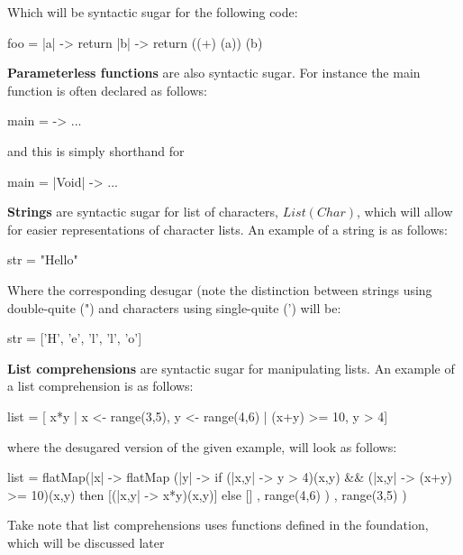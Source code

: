 Which will be syntactic sugar for the following code:
\begin{kite}

  foo = |a| -> {
    return |b| -> {
      return ((+) (a)) (b)
    }
  }
\end{kite}

\textbf{Parameterless functions} are also syntactic sugar. For instance the main function is often declared as follows:

\begin{kite}

main = -> 
{
  ...
}
\end{kite}

and this is simply shorthand for

\begin{kite}

main = |Void| -> 
{
  ...
}
\end{kite}

\textbf{Strings} are syntactic sugar for list of characters, $List(Char)$,
which will allow for easier representations of character lists. An
example of a string is as follows:
\begin{kite}
  
  str = "Hello"
\end{kite}

Where the corresponding desugar (note the distinction between strings
using double-quite (") and characters using single-quite (') will be:
\begin{kite}
  
  str = ['H', 'e', 'l', 'l', 'o']
\end{kite}

\label{sec:ex-listcomp}
\textbf{List comprehensions} are syntactic sugar for manipulating
lists. An example of a list comprehension is as follows:
\begin{kite}
  
  list = [ x*y | x <- range(3,5), y <- range(4,6) | (x+y) >= 10, y > 4]
\end{kite}
where the desugared version of the given example, will look as follows:
\begin{kite}

  list =
  flatMap(|x| -> {
    flatMap (|y| -> {
      if (|x,y| -> {y > 4})(x,y) && (|x,y| -> {(x+y) >= 10})(x,y) 
         then [(|x,y| -> {x*y})(x,y)] 
         else []
    } , range(4,6) )
}, range(3,5) )
\end{kite}
Take note that list comprehensions uses functions defined in the
foundation, which will be discussed later
\\

